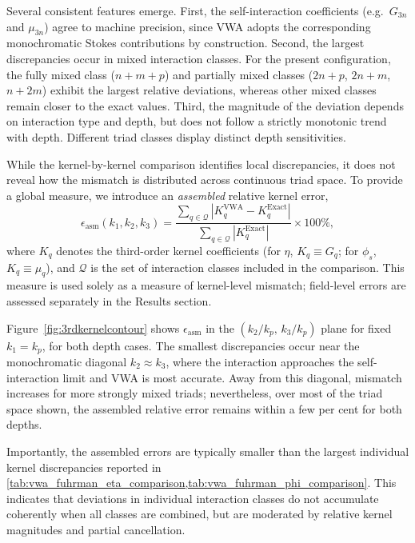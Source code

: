 \documentclass[lineno]{JFM-FLM_Au}
\begin{document}
Several consistent features emerge. First, the self-interaction coefficients (e.g.\ $G_{3n}$ and $\mu_{3n}$) agree to machine precision, since VWA adopts the corresponding monochromatic Stokes contributions by construction. Second, the largest discrepancies occur in mixed interaction classes. For the present configuration, the fully mixed class ($n+m+p$) and partially mixed classes ($2n+p$, $2n+m$, $n+2m$) exhibit the largest relative deviations, whereas other mixed classes remain closer to the exact values. Third, the magnitude of the deviation depends on interaction type and depth, but does not follow a strictly monotonic trend with depth. 
Different triad classes display distinct depth sensitivities.


While the kernel-by-kernel comparison identifies local discrepancies, it does not reveal how the mismatch is distributed across continuous triad space. 
To provide a global measure, we introduce an \emph{assembled} relative kernel error,
\begin{equation}
\label{method:assembled_error_def_clean}
\epsilon_{\mathrm{asm}}(k_1,k_2,k_3)
=
\frac{\sum_{q\in\mathcal{Q}}
\left|K^{\mathrm{VWA}}_{q}-K^{\mathrm{Exact}}_{q}\right|}
{\sum_{q\in\mathcal{Q}}
\left|K^{\mathrm{Exact}}_{q}\right|}
\times 100\%,
\end{equation}
where $K_q$ denotes the third-order kernel coefficients (for $\eta$, $K_q\equiv G_q$; for $\phi_s$, $K_q\equiv \mu_q$), and $\mathcal{Q}$ is the set of interaction classes included in the comparison. 
This measure is used solely as a measure of kernel-level mismatch; field-level errors are assessed separately in the Results section.

Figure~\ref{fig:3rdkernelcontour} shows $\epsilon_{\mathrm{asm}}$ in the $(k_2/k_p,\,k_3/k_p)$ plane for fixed $k_1=k_p$, for both depth cases.
The smallest discrepancies occur near the monochromatic diagonal $k_2\approx k_3$, where the interaction approaches the self-interaction limit and VWA is most accurate. 
Away from this diagonal, mismatch increases for more strongly mixed triads; nevertheless, over most of the triad space shown, the assembled relative error remains within a few per cent for both depths.

Importantly, the assembled errors are typically smaller than the largest individual kernel discrepancies reported in \cref{tab:vwa_fuhrman_eta_comparison,tab:vwa_fuhrman_phi_comparison}. 
This indicates that deviations in individual interaction classes do not accumulate coherently when all classes are combined, but are moderated by relative kernel magnitudes and partial cancellation.
\end{document}
